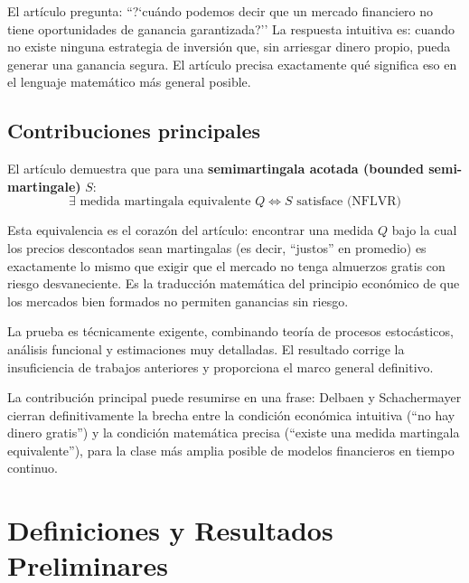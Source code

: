 \documentclass[12pt]{article}
\begin{document}
\begin{intuicion}
El art\'iculo pregunta: ``?`cu\'ando podemos decir que un mercado financiero no tiene oportunidades de ganancia garantizada?'' La respuesta intuitiva es: cuando no existe ninguna estrategia de inversi\'on que, sin arriesgar dinero propio, pueda generar una ganancia segura. El art\'iculo precisa exactamente qu\'e significa eso en el lenguaje matem\'atico m\'as general posible.
\end{intuicion}

\subsection{Contribuciones principales}

El art\'iculo demuestra que para una \textbf{semimartingala acotada (bounded semi-martingale)} $S$:
\begin{equation}
    \exists \text{ medida martingala equivalente } Q \iff S \text{ satisface (NFLVR)}
\end{equation}

\begin{intuicionmat}
Esta equivalencia es el coraz\'on del art\'iculo: encontrar una medida $Q$ bajo la cual los precios descontados sean martingalas (es decir, ``justos'' en promedio) es exactamente lo mismo que exigir que el mercado no tenga almuerzos gratis con riesgo desvaneciente. Es la traducci\'on matem\'atica del principio econ\'omico de que los mercados bien formados no permiten ganancias sin riesgo.
\end{intuicionmat}

La prueba es t\'ecnicamente exigente, combinando teor\'ia de procesos estoc\'asticos, an\'alisis funcional y estimaciones muy detalladas. El resultado corrige la insuficiencia de trabajos anteriores y proporciona el marco general definitivo.

\begin{intuicion}
La contribuci\'on principal puede resumirse en una frase: Delbaen y Schachermayer cierran definitivamente la brecha entre la condici\'on econ\'omica intuitiva (``no hay dinero gratis'') y la condici\'on matem\'atica precisa (``existe una medida martingala equivalente''), para la clase m\'as amplia posible de modelos financieros en tiempo continuo.
\end{intuicion}

\section{Definiciones y Resultados Preliminares}
\end{document}
